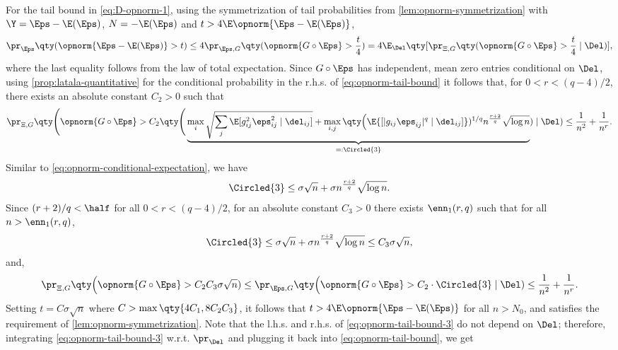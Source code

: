 \documentclass[10pt]{article}
\begin{document}
For the tail bound in \cref{eq:D-opnorm-1}, using the symmetrization of tail probabilities from \cref{lem:opnorm-symmetrization} with $\Y = {\Eps - \E(\Eps)}$, $N = -\E(\Eps)$ and $t > 4\E\opnorm{\Eps - \E(\Eps)}$,
\begin{align}
    \pr_{\Eps}\qty( \opnorm{\Eps - \E(\Eps)} > t ) \le 4 \pr_{\Eps, G}\qty(\opnorm{G \circ \Eps} > \frac{t}{4}) = 4 \E_{\Del} \qty[ \pr_{\Xi, G}\qty(\opnorm{G \circ \Eps} > \frac{t}{4} \mid \Del) ],\label{eq:opnorm-tail-bound}
\end{align}
where the last equality follows from the law of total expectation. Since $G \circ \Eps$ has independent, mean zero entries conditional on $\Del$, using \cref{prop:latala-quantitative} for the conditional probability in the r.h.s. of \cref{eq:opnorm-tail-bound} it follows that, for $0 < r < (q-4)/2$, there exists an absolute constant $C_2 > 0$ such that
\begin{align}
    \pr_{\Xi, G}\qty\Bigg( \opnorm{G \circ \Eps} > C_2 \qty\Bigg(\underbrace{{\max_{i}\sqrt{\sum_{j}\E [g_{ij}^2\eps_{ij}^2 \mid \del_{ij}]}} + \max_{i,j}\qty\Big(\E{[|g_{ij}\eps_{ij}|^q  \mid \del_{ij}]})^{1/q} n^{\frac{r+2}{q}}\sqrt{\log{n}}}_{=:\Circled{3}}) \mid \Del ) \le \frac{1}{n^2} + \frac{1}{n^r}.\label{eq:opnorm-tail-bound-2}
\end{align}
Similar to \cref{eq:opnorm-conditional-expectation}, we have 
\begin{align}
    \Circled{3} \le \sigma \sqrt{n} + \sigma n^{\frac{r+2}{q}}\sqrt{\log{n}}.\label{eq:circled-3}
\end{align}
Since $(r+2)/q < \half$ for all $0 < r < (q-4)/2$, for an absolute constant $C_3 > 0$ there exists $\enn_1(r, q)$ such that for all $n > \enn_1(r, q)$,
\begin{align}
    \Circled{3} \le \sigma \sqrt{n} + \sigma n^{\frac{r+2}{q}}\sqrt{\log{n}} \le C_3\sigma\sqrt{n},
\end{align}
and,
\begin{align}
    \pr_{\Xi, G}\qty\Big( \opnorm{G \circ \Eps} > C_2C_3 \sigma\sqrt{n} ) \le \pr_{\Eps, G}\qty\Big( \opnorm{G \circ \Eps} > C_2 \cdot \Circled{3} \mid \Del ) \le \frac{1}{n^2} + \frac{1}{n^r}.\label{eq:opnorm-tail-bound-3}
\end{align}
Setting $t = C\sigma\sqrt{n}$ where $C > \max\qty{4C_1, 8C_2C_3}$, it follows that $t > 4\E\opnorm{\Eps - \E(\Eps)}$ for all $n > N_0$, and satisfies the requirement of \cref{lem:opnorm-symmetrization}. Note that the l.h.s. and r.h.s. of \cref{eq:opnorm-tail-bound-3} do not depend on $\Del$; therefore, integrating \cref{eq:opnorm-tail-bound-3} w.r.t. $\pr_{\Del}$ and plugging it back into \cref{eq:opnorm-tail-bound}, we get
\end{document}
